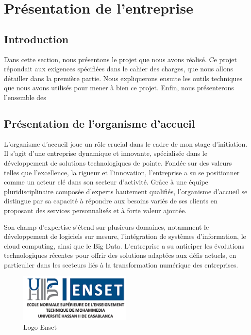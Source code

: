 \renewcommand{\chaptername}{Partie}

\label{part:introduction-generale}
\chapter{Présentation de l'entreprise}
\section{Introduction }
Dans cette section, nous présentons le projet que nous avons réalisé. Ce projet répondait aux exigences spécifiées dans le cahier des charges, que nous allons détailler dans la première partie. Nous expliquerons ensuite les outils techniques  que nous avons utilisés pour mener à bien ce projet. Enfin, nous présenterons l'ensemble des \\

\section{Présentation de l’organisme d’accueil}
L’organisme d’accueil joue un rôle crucial dans le cadre de mon stage d’initiation. Il s'agit d'une entreprise dynamique et innovante, spécialisée dans le développement de solutions technologiques de pointe. Fondée sur des valeurs telles que l'excellence, la rigueur et l'innovation, l'entreprise a su se positionner comme un acteur clé dans son secteur d'activité. Grâce à une équipe pluridisciplinaire composée d'experts hautement qualifiés, l’organisme d’accueil se distingue par sa capacité à répondre aux besoins variés de ses clients en proposant des services personnalisés et à forte valeur ajoutée.

Son champ d’expertise s’étend sur plusieurs domaines, notamment le développement de logiciels sur mesure, l'intégration de systèmes d'information, le cloud computing, ainsi que le Big Data. L'entreprise a su anticiper les évolutions technologiques récentes pour offrir des solutions adaptées aux défis actuels, en particulier dans les secteurs liés à la transformation numérique des entreprises. \\

\begin{figure}[h]
\centering
\includegraphics[width=0.5\textwidth]{LOGOS/enset_mohammedia_0.png}
\caption{Logo Enset}
\label{fig:image-label}
\end{figure}

